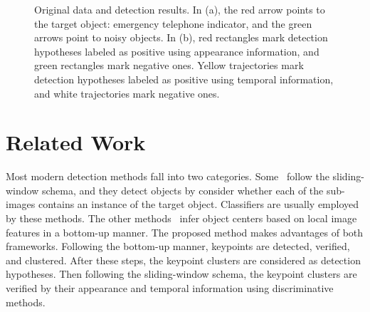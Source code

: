 \begin{figure}
\centering
{}
\caption[Target objects and detection results]{Original data and detection results. In (a), the red arrow points to the target object: emergency telephone indicator, and the green arrows point to noisy objects. In (b), red rectangles mark detection hypotheses labeled as positive using appearance information, and green rectangles mark negative ones. Yellow trajectories mark detection hypotheses labeled as positive using temporal information, and white trajectories mark negative ones.}
\label{fig:first}
\end{figure}









\section{Related Work}
\label{rw}

Most modern detection methods fall into two categories. Some~\citep{ij4,ac31,ac30,ac4,ac32,ac29,ac28,ac1} follow the sliding-window schema, and they detect objects by consider whether each of the sub-images contains an instance of the target object. Classifiers are usually employed by these methods. The other methods~\citep{ac9,ac2,ac3,ac22,lb1,ac5,ac10,ac21,ac18} infer object centers based on local image features in a bottom-up manner. The proposed method makes advantages of both frameworks. Following the bottom-up manner, keypoints are detected, verified, and clustered. After these steps, the keypoint clusters are considered as detection hypotheses. Then following the sliding-window schema, the keypoint clusters are verified by their appearance and temporal information using discriminative methods.

